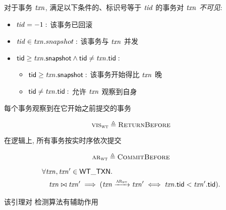 \begin{frame}{}
  

  \begin{center}
	对于事务 $\mathit{txn}$, 满足以下条件的、标识号等于 $\mathit{tid}$ 的事务对 $\mathit{txn}$ \emph{不可见}:
  \end{center}
  \begin{itemize}
	\setlength{\itemsep}{10pt}
	\item $\mathit{tid} = -1:$ 该事务已回滚
	\item $\mathit{tid} \in \mathit{txn}.snapshot:$ 该事务与 $\mathit{txn}$ 并发
	\item ${\sf tid} \ge \mathit{txn}.{\sf snapshot} \land {\sf tid} \neq \mathit{txn}.{\sf tid}:$
	  \vspace{0.20cm}
	  \begin{itemize}
		\setlength{\itemsep}{5pt}
		\item ${\sf tid} \ge \mathit{txn}.{\sf snapshot}:$ 该事务开始得比 $\mathit{txn}$ 晚
		\item ${\sf tid} \neq \mathit{txn}.{\sf tid}:$ 允许 $\mathit{txn}$ 观察到自身
	  \end{itemize}
  \end{itemize}
\end{frame}

\begin{frame}{}
  \begin{center}
	每个事务观察到在它开始之前提交的事务
  \end{center}

  \begin{definition}
	\[
	  \textsc{vis}_{\textsc{wt}} \triangleq \textsc{ReturnBefore}
	\]
  \end{definition}

  \pause
  \vspace{0.80cm}
  \begin{center}
	在逻辑上, 所有事务按实时序依次提交
  \end{center}
  \begin{definition}
	\[
	  \textsc{ar}_{\textsc{wt}} \triangleq \textsc{CommitBefore}
	\]
  \end{definition}
\end{frame}

\begin{frame}{}
  \begin{lemma}[冲突事务的提交顺序]
	\vspace{-0.30cm}
    \begin{align*}
      &\forall \mathit{txn}, \mathit{txn}' \in {\sf WT\_TXN}.\; \\
        &\quad \mathit{txn} \bowtie \mathit{txn}' \implies (\mathit{txn} \xrightarrow{\textsc{ar}_{\textsc{wt}}} \mathit{txn}'
          \iff \mathit{txn}.{\sf tid} < \mathit{txn}'.{\sf tid}).
    \end{align*}
  \end{lemma}

  \vspace{0.60cm}
  \begin{center}
	该引理对 \strongsi{} 检测算法有辅助作用
  \end{center}
\end{frame}

